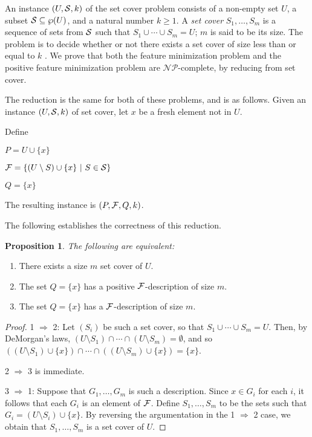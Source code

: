 \documentclass[11pt,a4paper]{article}
\newtheorem{proposition}{Proposition}
\begin{document}
An instance $(U, \mathcal{S}, k)$ of the
set cover problem consists of a non-empty set $U$,
a subset $\mathcal{S} \subseteq \wp(U)$, and a natural number
$k \geq 1$.  
A \emph{set cover}
$S_1, \ldots, S_m$ is a sequence of sets 
from $\mathcal{S}$ such that $S_1 \cup \cdots \cup S_m = U$;
$m$ is said to be its size.
The problem is to decide
whether or not there exists a set cover 
of size less than or equal to $k$ \citep{karp1972}.
We prove that both the 
feature minimization problem
and the
positive feature minimization problem
are $\mathcal{NP}$-complete, by reducing from set cover.

The reduction is the same for both of these problems,
and is as follows.  
Given an instance $(U,\mathcal{S},k)$ of set cover,
let $x$ be a fresh element not in $U$.

Define

\bigskip

$P = U \cup \{ x \}$

$\mathcal{F} = \{ (U \setminus S) \cup \{ x \} ~|~ S \in \mathcal{S} \}$

$Q = \{ x \}$

\bigskip

The resulting instance is $(P,\mathcal{F},Q,k)$.

The following establishes the correctness of this reduction.

\begin{proposition}
The following are equivalent:
\end{proposition}

\begin{enumerate}
\item There exists a size $m$ set cover of $U$.
\item The set $Q = \{ x \}$ has a positive $\mathcal{F}$-description
of size $m$.
\item The set $Q = \{ x \}$ has a  $\mathcal{F}$-description
of size $m$.
\end{enumerate}

\begin{proof}
1 $\Rightarrow$ 2: Let $(S_i)$ be such a set cover,
so that $S_1 \cup \cdots \cup S_m = U$.
Then, by DeMorgan's laws,
$(U \setminus S_1) \cap \cdots \cap (U \setminus S_m) = \emptyset$,
and so
$((U \setminus S_1) \cup \{ x \}) \cap \cdots \cap 
 ((U \setminus S_m) \cup \{ x \}) = \{x\}$.

2 $\Rightarrow$ 3 is immediate.

3 $\Rightarrow$ 1:
Suppose that $G_1, \ldots, G_m$ is such a description.
Since $x \in G_i$ for each $i$, it follows that
each $G_i$ is an element of $\mathcal{F}$.
Define $S_1, \ldots, S_m$ to be the sets such that
$G_i = (U \setminus S_i) \cup \{ x \}$.
By reversing the argumentation in the 1 $\Rightarrow$ 2
case, we obtain that $S_1, \ldots, S_m$ is a set cover of
$U$.
\end{proof}
\end{document}
